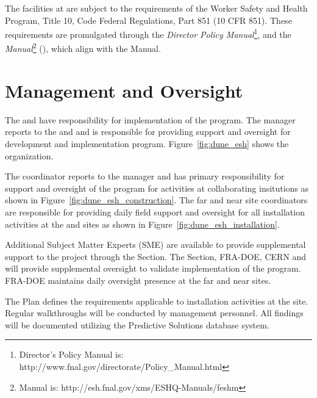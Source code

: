 The  facilities at  are subject to
the requirements of the  Worker Safety and Health Program,
Title 10, Code Federal Regulations, Part 851 (10 CFR 851). These
requirements are promulgated through the {\it \fnal Director Policy
Manual}\footnote{\fnal Director's Policy Manual is:
  http://www.fnal.gov/directorate/Policy\_Manual.html}, and the {\it \fnal
{} Manual}\footnote{\fnal {} Manual is:
  http://esh.fnal.gov/xms/ESHQ-Manuals/feshm} (), which
align with the   Manual.


\section{  Management and Oversight}

The  and  have responsibility for
implementation of the   program.  The
  manager reports to the
 and  and is responsible for providing
 support and oversight for development and implementation
  program. Figure~\ref{fig:dune_esh} shows
the   organization.


The   coordinator reports to the
  manager and has primary responsibility
for  support and oversight of the  
program for activities at collaborating insitutions as shown in
Figure~\ref{fig:dune_esh_construction}.  The far and near site
 coordinators are responsible for providing daily field support and
oversight for all installation activities at the 
and  sites as shown in Figure~\ref{fig:dune_esh_installation}.

Additional  Subject Matter Experts (SME) are available to
provide supplemental support to the project through the \fnal
{} Section. The \fnal {} Section, FRA-DOE, CERN and
 will provide supplemental  oversight to
validate implementation of the  
program. FRA-DOE maintains daily oversight presence at the far and
near sites.

The   Plan defines the 
requirements applicable to installation activities at the 
site. Regular  walkthroughs will be conducted by
  management personnel. All
findings will be documented utilizing the \fnal Predictive Solutions
database system.

